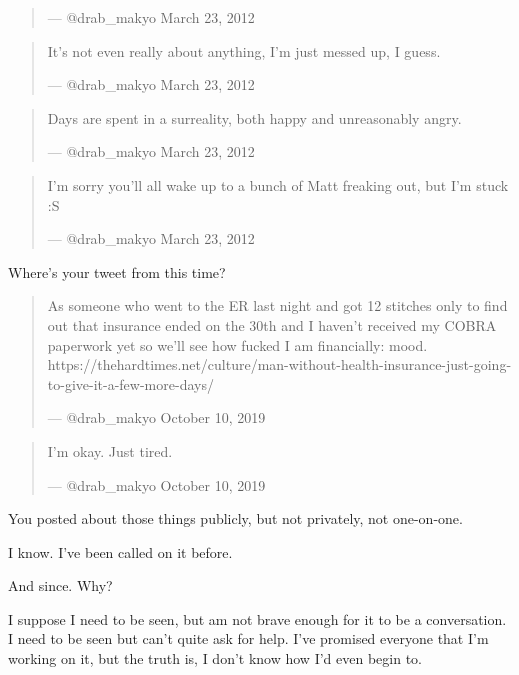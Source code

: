 \begin{paracol}{2}
\begin{leftcolumn}
\begin{quotation}
--- @drab\_makyo March 23, 2012
\end{quotation}

\begin{quotation}
\noindent It's not even really about anything, I'm just messed up, I guess.

--- @drab\_makyo March 23, 2012
\end{quotation}

\begin{quotation}
\noindent Days are spent in a surreality, both happy and unreasonably angry.

--- @drab\_makyo March 23, 2012
\end{quotation}

\begin{quotation}
\noindent I'm sorry you'll all wake up to a bunch of Matt freaking out, but I'm stuck :S

--- @drab\_makyo March 23, 2012
\end{quotation}

\begin{ally}
Where's your tweet from this time?
\end{ally}

\begin{quotation}
\noindent As someone who went to the ER last night and got 12 stitches only to find out that insurance ended on the 30th and I haven't received my COBRA paperwork yet so we'll see how fucked I am financially: mood. https://thehardtimes.net/culture/man-without-health-insurance-just-going-to-give-it-a-few-more-days/

--- @drab\_makyo October 10, 2019
\end{quotation}
\newpage
\null
\vfill
\begin{quotation}
\noindent I'm okay. Just tired.

--- @drab\_makyo October 10, 2019
\end{quotation}
\vfill
\newpage

\begin{ally}
You posted about those things publicly, but not privately, not one-on-one.
\end{ally}
I know. I've been called on it before.

\begin{ally}
And since. Why?
\end{ally}
I suppose I need to be seen, but am not brave enough for it to be a conversation. I need to be seen but can't quite ask for help. I've promised everyone that I'm working on it, but the truth is, I don't know how I'd even begin to.


\end{leftcolumn}
\end{paracol}
